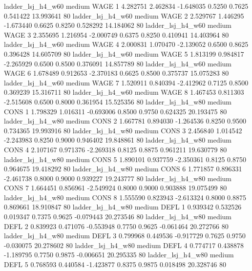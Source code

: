      ladder_lsj_h4_w60     medium     WAGE                 1  4.282751 2.462834 -1.648035 0.5250 0.7625  0.541422   13.993641 80
     ladder_lsj_h4_w60     medium     WAGE                 2  2.529767 1.446295 -1.673440 0.6625 0.8250  0.528292   14.184062 80
     ladder_lsj_h4_w60     medium     WAGE                 3  2.355695 1.216954 -2.000749 0.6375 0.8250  0.410941   14.403964 80
     ladder_lsj_h4_w60     medium     WAGE                 4  2.000831 1.070470 -2.139052 0.6500 0.8625  0.396428   14.605709 80
     ladder_lsj_h4_w60     medium     WAGE                 5  1.813199 0.984817 -2.265929 0.6500 0.8500  0.376091   14.857789 80
     ladder_lsj_h4_w60     medium     WAGE                 6  1.678489 0.912653 -2.370183 0.6625 0.8500  0.375737   15.075283 80
     ladder_lsj_h4_w60     medium     WAGE                 7  1.520911 0.840394 -2.412962 0.7125 0.8500  0.369239   15.316711 80
     ladder_lsj_h4_w60     medium     WAGE                 8  1.467453 0.811303 -2.515608 0.6500 0.8000  0.361954   15.525356 80
     ladder_lsj_h4_w80     medium     CONS                 1  1.798329 1.016311 -0.693006 0.8500 0.9750  0.624325   20.193475 80
     ladder_lsj_h4_w80     medium     CONS                 2  1.667781 0.894030 -1.264536 0.8250 0.9500  0.734365   19.993916 80
     ladder_lsj_h4_w80     medium     CONS                 3  2.456840 1.014542 -2.243983 0.8250 0.9000  0.946402   19.848861 80
     ladder_lsj_h4_w80     medium     CONS                 4  2.107167 0.971376 -2.269318 0.8125 0.8875  0.961211   19.630779 80
     ladder_lsj_h4_w80     medium     CONS                 5  1.890101 0.937759 -2.350361 0.8125 0.8750  0.964675   19.418292 80
     ladder_lsj_h4_w80     medium     CONS                 6  1.771857 0.896331 -2.461738 0.8000 0.9000  0.939227   19.243777 80
     ladder_lsj_h4_w80     medium     CONS                 7  1.664451 0.856961 -2.549924 0.8000 0.9000  0.903888   19.075499 80
     ladder_lsj_h4_w80     medium     CONS                 8  1.555590 0.823943 -2.613324 0.8000 0.8875  0.869661   18.910847 80
     ladder_lsj_h4_w80     medium     DEFL                 1  0.939342 0.532526  0.019347 0.7375 0.9625 -0.079443   20.273546 80
     ladder_lsj_h4_w80     medium     DEFL                 2  0.839923 0.471076 -0.553948 0.7750 0.9625 -0.061464   20.272766 80
     ladder_lsj_h4_w80     medium     DEFL                 3  0.799968 0.449536 -0.917729 0.7625 0.9750 -0.030075   20.278602 80
     ladder_lsj_h4_w80     medium     DEFL                 4  0.774717 0.438878 -1.189795 0.7750 0.9875 -0.006651   20.295335 80
     ladder_lsj_h4_w80     medium     DEFL                 5  0.768593 0.440584 -1.423877 0.8375 0.9875  0.018498   20.328746 80
